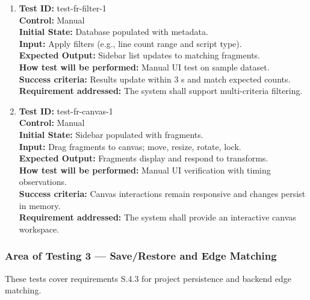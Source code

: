 \documentclass[12pt, titlepage]{article}
\begin{document}
\begin{enumerate}
    \item
    \textbf{Test ID:} test-fr-filter-1\\
    \textbf{Control:} Manual\\
    \textbf{Initial State:} Database populated with metadata.\\
    \textbf{Input:} Apply filters (e.g., line count range and script type).\\
    \textbf{Expected Output:} Sidebar list updates to matching fragments.\\
    \textbf{How test will be performed:} Manual UI test on sample dataset.\\
    \textbf{Success criteria:} Results update within 3 s and match expected counts.\\
    \textbf{Requirement addressed:} The system shall support multi-criteria filtering.\\

    \item
    \textbf{Test ID:} test-fr-canvas-1\\
    \textbf{Control:} Manual\\
    \textbf{Initial State:} Sidebar populated with fragments.\\
    \textbf{Input:} Drag fragments to canvas; move, resize, rotate, lock.\\
    \textbf{Expected Output:} Fragments display and respond to transforms.\\
    \textbf{How test will be performed:} Manual UI verification with timing observations.\\
    \textbf{Success criteria:} Canvas interactions remain responsive and changes persist in memory.\\
    \textbf{Requirement addressed:} The system shall provide an interactive canvas workspace.\\
\end{enumerate}

\subsubsection{Area of Testing 3 — Save/Restore and Edge Matching}

These tests cover requirements S.4.3 for project persistence and backend edge matching.
\end{document}
